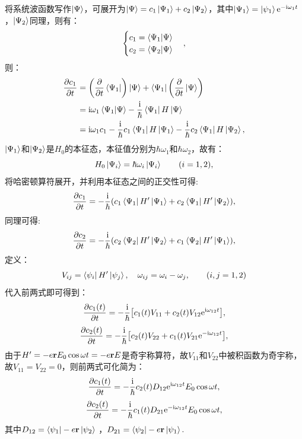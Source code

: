 \documentclass[12pt, a4paper, oneside]{ctexart}
\newcommand{\iu}{\mathrm{i}}
\begin{document}
	将系统波函数写作$\ket{\Psi}$，可展开为$\ket{\Psi} = c_1 \ket{\Psi_1} + c_2 \ket{\Psi_2}$，其中$\ket{\Psi_1} = \ket{\psi_1} \mathrm{e}^{-\mathrm{i}\omega_1t}$，$\ket{\Psi_2}$同理，则有：
	$$
	\begin{cases}
		c_1  = \braket{\Psi_1}{\Psi} \\ 
		c_2  = \braket{\Psi_2}{\Psi}
	\end{cases},
	$$
	则：
	\begin{align*}
		\pdv{c_1}{t} &= \qty(\pdv{t} \bra{\Psi_1} ) \ket{\Psi} + \bra{\Psi_1} \qty(\pdv{t}\ket{\Psi}) \\
		&= \mathrm{i} \omega_1 \braket{\Psi_1}{\Psi} - \frac{\iu}{\hbar} \bra{\Psi_1}H\ket{\Psi} \\
		& = \iu \omega_1 c_1 - \frac{\iu}{\hbar} c_1 \bra{\Psi_1}H\ket{\Psi_1} -\frac{\iu}{\hbar} c_2 \bra{\Psi_1}H\ket{\Psi_2},
	\end{align*}
	$\ket{\Psi_1}$和$\ket{\Psi_2}$是$H_0$的本征态，本征值分别为$\hbar\omega_1$和$\hbar\omega_2$，故有：
	\begin{equation*}
		H_0 \ket{\Psi_i}  = \hbar\omega_i \ket{\Psi_i} \qquad (i=1,2),
	\end{equation*}
	将哈密顿算符展开，并利用本征态之间的正交性可得:
	\begin{equation}
		\pdv{c_1}{t} = - \frac{\iu}{\hbar} \qty(c_1\bra{\Psi_1}H'\ket{\Psi_1} + c_2 \bra{\Psi_1}H'\ket{\Psi_2}),
	\end{equation}
	同理可得:
	\begin{equation}
		\pdv{c_2}{t} = - \frac{\iu}{\hbar} \qty(c_2\bra{\Psi_2}H'\ket{\Psi_2} + c_1 \bra{\Psi_2}H'\ket{\Psi_1}),
	\end{equation}
	定义：
	\begin{equation*}
		V_{ij} = \bra{\psi_i}H'\ket{\psi_j} ,\quad \omega_{ij} = \omega_i - \omega_j,   \qquad (i,j = 1,2)
	\end{equation*}
	代入前两式即可得到：
	\begin{equation}
		\pdv{c_1(t)}{t} = -\frac{\iu}{\hbar} \qty[c_1(t)V_{11}+c_2(t)V_{12}\mathrm{e}^{\iu \omega_{12}t}],		
	\end{equation}
	\begin{equation}
		\pdv{c_2(t)}{t} = -\frac{\iu}{\hbar} \qty[c_2(t)V_{22}+c_1(t)V_{21}\mathrm{e}^{-\iu \omega_{12}t}],
	\end{equation}
	由于$H' = -e\vb{r}E_0 \cos \omega t = -e\vb{r}E $是奇宇称算符，故$V_{11}$和$V_{22}$中被积函数为奇宇称，故$V_{11} = V_{22} = 0$，则前两式可化简为：
	\begin{equation}
		\pdv{c_1(t)}{t} = -\frac{\iu}{\hbar} c_2(t) D_{12}\mathrm{e}^{\iu \omega_{12}t} E_0 \cos \omega t,
	\end{equation}
	\begin{equation}
		\pdv{c_2(t)}{t} = -\frac{\iu}{\hbar} c_1(t) D_{21}\mathrm{e}^{-\iu \omega_{12}t} E_0 \cos \omega t,
	\end{equation}
	其中$D_{12} = \bra{\psi_1}-e \vb{r} \ket{\psi_2} $ ，$D_{21} = \bra{\psi_2}-e \vb{r} \ket{\psi_1}. $
	
\end{document}
